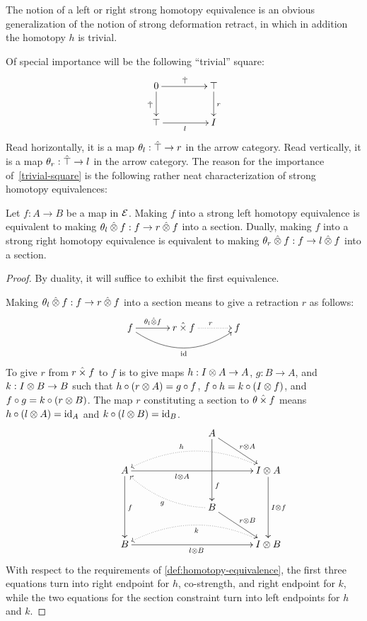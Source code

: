 \documentclass[reqno,10pt,a4paper,oneside]{amsart}
\begin{document}
The notion of a left or right strong homotopy equivalence is an obvious generalization of the notion of strong deformation retract, in which in addition the homotopy $h$ is trivial.

Of special importance will be the following ``trivial'' square:
\begin{equation}
\label{trivial-square}
\begin{gathered}
\xymatrix@C+2em{
  0
  \ar[r]^{\hatunit}
  \ar[d]_{\hatunit}
&
  \unit
  \ar[d]^{\intervalr}
\\
  \unit
  \ar[r]_{\intervall}
&
  \interval
}
\end{gathered}
\end{equation}
Read horizontally, it is a map $\theta_{l} : \hat{\top} \to r$ in the arrow category.
Read vertically, it is a map $\theta_{r} : \hat{\top} \to l$ in the arrow category.
The reason for the importance of~\eqref{trivial-square} is the following rather neat characterization of strong homotopy equivalences:
\begin{lemma}
\label{strong-h-equiv-as-section}
Let $f : A \to B$ be a map in $\mathcal{E}$.
Making $f$ into a strong left homotopy equivalence is equivalent to making $\theta_{l} \mathbin{\hat{\otimes}} f : f \to r \mathbin{\hat{\otimes}} f$ into a section.
Dually, making $f$ into a strong right homotopy equivalence is equivalent to making $\theta_{r} \mathbin{\hat{\otimes}} f : f \to l \mathbin{\hat{\otimes}} f$ into a section.
\end{lemma}

\begin{proof}
By duality, it will suffice to exhibit the first equivalence.

Making $\theta_{l} \mathbin{\hat{\otimes}} f : f \to r \mathbin{\hat{\otimes}} f$ into a section means to give a retraction $r$ as follows:
\[
\xymatrix@C+1em{
  f
  \ar[r]^-{\thetal \hatotimes f}
  \ar@/_2em/[rr]_{\id}
&
  \intervalr \hattimes f
  \ar@{.>}[r]^{r}
&
  f
}
\]
To give $r$ from $r \mathbin{\hat{\times}} f$ to $f$ is to give maps $h : I \otimes A \to A$, $g : B \to A$, and $k : I \otimes B \to B$ such that $h \mathbin{\circ} (r \otimes A) = g \mathbin{\circ} f$, $f \mathbin{\circ} h = k \mathbin{\circ} (I \otimes f)$, and $f \mathbin{\circ} g = k \mathbin{\circ} (r \otimes B)$.
The map $r$ constituting a section to $\theta \mathbin{\hat{\times}} f$ means $h \mathbin{\circ} (l \otimes A) = \operatorname{id}_A$ and $k \mathbin{\circ} (l \otimes B) = \operatorname{id}_B$.
\[
\xymatrix@C+1em{
&&&
  A
  \ar[dr]^{\intervalr \otimes A}
  \ar[dd]^(0.7){f}
\\&
  A
  \ar[dd]^{f}
  \ar[rrr]_(0.4){\intervall \otimes A}
&&&
  \interval \otimes A
  \ar[dd]^{\interval \otimes f}
  \ar@{.>}@/_2em/[lll]_(0.6){h}
\\&&&
  B
  \ar[dr]^{\intervalr \otimes B}
  \ar@{.>}@/^1em/[llu]^{g}
\\&
  B
  \ar[rrr]_{\intervall \otimes B}
&&&
  \interval \otimes B
  \ar@{.>}@/_2em/[lll]^{k}
}
\]
With respect to the requirements of \cref{def:homotopy-equivalence}, the first three equations turn into right endpoint for $h$, co-strength, and right endpoint for $k$, while the two equations for the section constraint turn into left endpoints for $h$ and $k$.
\end{proof}
\end{document}
